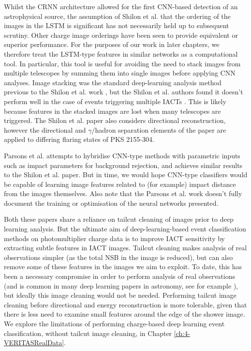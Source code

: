 Whilst the CRNN architecture allowed for the first CNN-based detection of an astrophysical source, the assumption of Shilon et al. that the ordering of the images in the LSTM is significant has not necessarily held up to subsequent scrutiny. Other charge image orderings \cite{ariconf} have been seen to provide equivalent or superior performance. For the purposes of our work in later chapters, we therefore treat the LSTM-type features in similar networks as a computational tool. In particular, this tool is useful for avoiding the need to stack images from multiple telescopes by summing them into single images before applying CNN analyses. Image stacking was the standard deep-learning analysis method previous to the Shilon et al. work \cite{mangano}, but the Shilon et al. authors found it doesn't perform well in the case of events triggering multiple IACTs \cite{Shilon,salvatore}. This is likely because features in the stacked images are lost when many telescopes are triggered. The Shilon et al. paper also considers directional reconstruction, however the directional and $\gamma$/hadron separation elements of the paper are applied to differing flaring states of PKS 2155-304.

Parsons et al. \cite{ParsonsOhm} attempts to hybridise CNN-type methods with parametric inputs such as impact parameters for background rejection, and achieves similar results to the Shilon et al. paper. But in time, we would hope CNN-type classifiers would be capable of learning image features related to (for example) impact distance from the images themselves. Also note that the Parsons et al. work doesn't fully document the training or optimisation of the neural networks presented.

Both these papers share a reliance on tailcut cleaning of images prior to deep learning analysis. But the ultimate aim of deep-learning-based event classification methods on photomultiplier charge data is to improve IACT sensitivity by extracting subtle features in IACT images. Tailcut cleaning makes analysis of real observations simpler (as the total NSB in the image is reduced), but can also remove some of these features in the images we aim to exploit. To date, this has been a necessary compromise in order to perform analysis of real observations (and is common in many deep learning papers in astronomy, see for example \cite{dodgygal}), but ideally this image cleaning would not be needed. Performing tailcut image cleaning before directional and energy reconstruction is more tolerable, given that there is less need to examine small features around the edge of the shower image. We explore the limitations of performing charge-based deep learning event classification, without tailcut image cleaning, in Chapter \ref{ch:4-VERITASRealData}.

